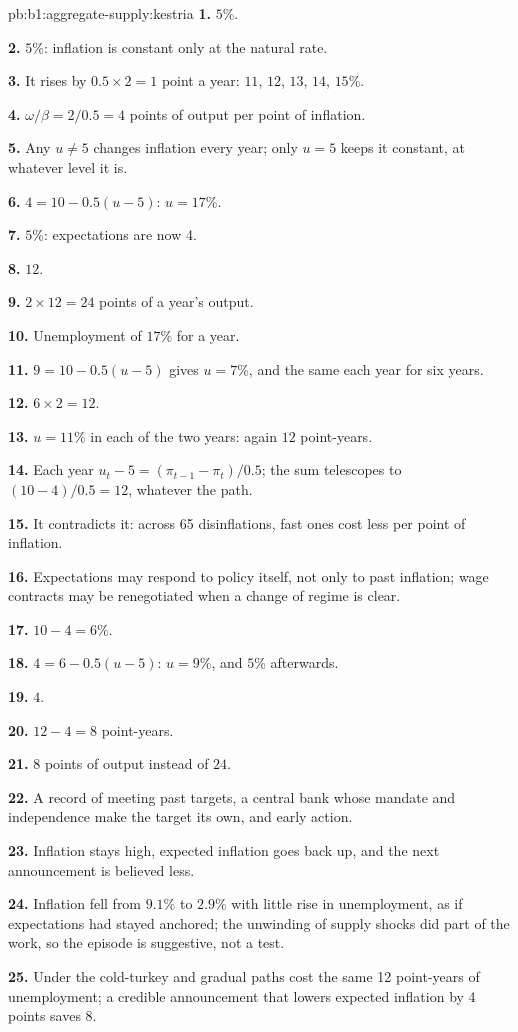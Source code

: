 \begin{solution}{pb:b1:aggregate-supply:kestria}
\textbf{1.} $5\%$.

\textbf{2.} $5\%$: inflation is constant only at the natural rate.

\textbf{3.} It rises by $0.5 \times 2 = 1$ point a year: $11$, $12$, $13$, $14$, $15\%$.

\textbf{4.} $\omega/\beta = 2/0.5 = 4$ points of output per point of inflation.

\textbf{5.} Any $u \ne 5$ changes inflation every year; only $u = 5$ keeps it constant,
at whatever level it is.

\textbf{6.} $4 = 10 - 0.5(u - 5)$: $u = 17\%$.

\textbf{7.} $5\%$: expectations are now 4.

\textbf{8.} $12$.

\textbf{9.} $2 \times 12 = 24$ points of a year's output.

\textbf{10.} Unemployment of $17\%$ for a year.

\textbf{11.} $9 = 10 - 0.5(u - 5)$ gives $u = 7\%$, and the same each year for six years.

\textbf{12.} $6 \times 2 = 12$.

\textbf{13.} $u = 11\%$ in each of the two years: again $12$ point-years.

\textbf{14.} Each year $u_t - 5 = (\pi_{t-1} - \pi_t)/0.5$; the sum telescopes to $(10 - 4)/0.5 = 12$, whatever
the path.

\textbf{15.} It contradicts it: across 65 disinflations, fast ones cost less per
point of inflation.

\textbf{16.} Expectations may respond to policy itself, not only to past
inflation; wage contracts may be renegotiated when a change of regime is
clear.

\textbf{17.} $10 - 4 = 6\%$.

\textbf{18.} $4 = 6 - 0.5(u - 5)$: $u = 9\%$, and $5\%$ afterwards.

\textbf{19.} $4$.

\textbf{20.} $12 - 4 = 8$ point-years.

\textbf{21.} $8$ points of output instead of $24$.

\textbf{22.} A record of meeting past targets, a central bank whose mandate and
independence make the target its own, and early action.

\textbf{23.} Inflation stays high, expected inflation goes back up, and the
next announcement is believed less.

\textbf{24.} Inflation fell from $9.1\%$ to $2.9\%$ with little rise in unemployment, as if
expectations had stayed anchored; the unwinding of supply shocks did part
of the work, so the episode is suggestive, not a test.

\textbf{25.} Under  the cold-turkey and gradual paths cost
the same 12 point-years of unemployment; a credible announcement that
lowers expected inflation by 4 points saves 8.
\end{solution}
